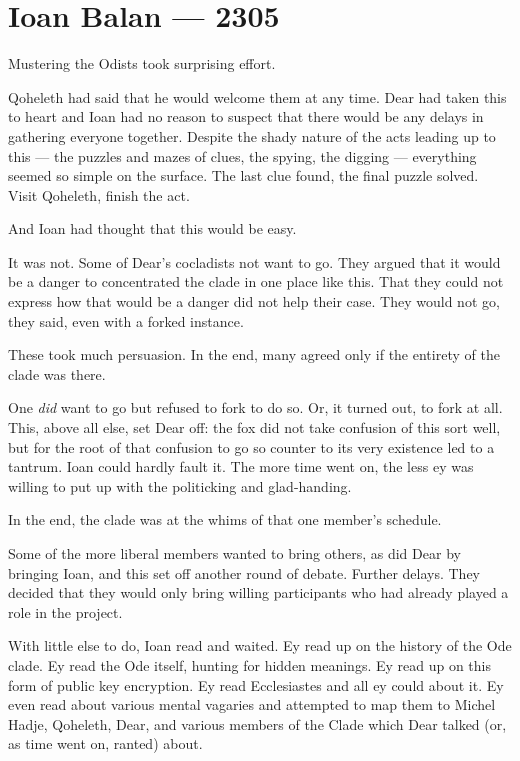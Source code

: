 \hypertarget{ioan-balan-2305}{%
\chapter*{Ioan Balan — 2305}\label{ioan-balan-2305}}

Mustering the Odists took surprising effort.

Qoheleth had said that he would welcome them at any time. Dear had taken this to heart and Ioan had no reason to suspect that there would be any delays in gathering everyone together. Despite the shady nature of the acts leading up to this — the puzzles and mazes of clues, the spying, the digging — everything seemed so simple on the surface. The last clue found, the final puzzle solved. Visit Qoheleth, finish the act.

And Ioan had thought that this would be easy.

It was not. Some of Dear's cocladists not want to go. They argued that it would be a danger to concentrated the clade in one place like this. That they could not express how that would be a danger did not help their case. They would not go, they said, even with a forked instance.

These took much persuasion. In the end, many agreed only if the entirety of the clade was there.

One \emph{did} want to go but refused to fork to do so. Or, it turned out, to fork at all. This, above all else, set Dear off: the fox did not take confusion of this sort well, but for the root of that confusion to go so counter to its very existence led to a tantrum. Ioan could hardly fault it. The more time went on, the less ey was willing to put up with the politicking and glad-handing.

In the end, the clade was at the whims of that one member's schedule.

Some of the more liberal members wanted to bring others, as did Dear by bringing Ioan, and this set off another round of debate. Further delays. They decided that they would only bring willing participants who had already played a role in the project.

With little else to do, Ioan read and waited. Ey read up on the history of the Ode clade. Ey read the Ode itself, hunting for hidden meanings. Ey read up on this form of public key encryption. Ey read Ecclesiastes and all ey could about it. Ey even read about various mental vagaries and attempted to map them to Michel Hadje, Qoheleth, Dear, and various members of the Clade which Dear talked (or, as time went on, ranted) about.


